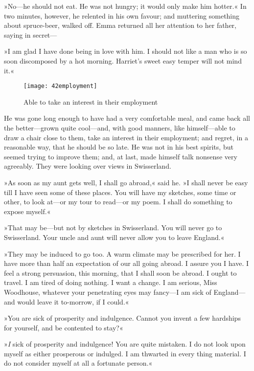 »No—he should not eat. He was not hungry; it would only make him hotter.« In two minutes, however, he relented in his own favour; and muttering something about spruce-beer, walked off. Emma returned all her attention to her father, saying in secret—

»I am glad I have done being in love with him. I should not like a man who is so soon discomposed by a hot morning. Harriet's sweet easy temper will not mind it.«

\begin{figure}[tbph]
\centering
\texttt{[image: 42employment]}
\caption{Able to take an interest in their employment}
\end{figure}

He was gone long enough to have had a very comfortable meal, and came back all the better—grown quite cool—and, with good manners, like himself—able to draw a chair close to them, take an interest in their employment; and regret, in a reasonable way, that he should be so late. He was not in his best spirits, but seemed trying to improve them; and, at last, made himself talk nonsense very agreeably. They were looking over views in Swisserland.

»As soon as my aunt gets well, I shall go abroad,« said he. »I shall never be easy till I have seen some of these places. You will have my sketches, some time or other, to look at—or my tour to read—or my poem. I shall do something to expose myself.«

»That may be—but not by sketches in Swisserland. You will never go to Swisserland. Your uncle and aunt will never allow you to leave England.«

»They may be induced to go too. A warm climate may be prescribed for her. I have more than half an expectation of our all going abroad. I assure you I have. I feel a strong persuasion, this morning, that I shall soon be abroad. I ought to travel. I am tired of doing nothing. I want a change. I am serious, Miss Woodhouse, whatever your penetrating eyes may fancy—I am sick of England—and would leave it to-morrow, if I could.«

»You are sick of prosperity and indulgence. Cannot you invent a few hardships for yourself, and be contented to stay?«

»\textit{I} sick of prosperity and indulgence! You are quite mistaken. I do not look upon myself as either prosperous or indulged. I am thwarted in every thing material. I do not consider myself at all a fortunate person.«

